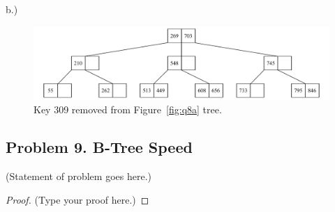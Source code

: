\documentclass[12pt]{article}
\begin{document}
	
	b.) 
	\begin{figure}[H] 
		\centering
		\includegraphics[width=0.9\linewidth]{Q8_b.drawio}
		\caption{Key 309 removed from Figure~\ref{fig:q8a} tree.}
		\label{fig:q8b}
	\end{figure}
	
	
	\vspace{2in} %
	
	
	\subsection*{Problem 9. B-Tree Speed}
	(Statement of problem goes here.)\\
	
	\begin{proof}
		(Type your proof here.)
	\end{proof}
	
	\vspace{2in} %
	
	
	
	
	
	
	
\end{document}
